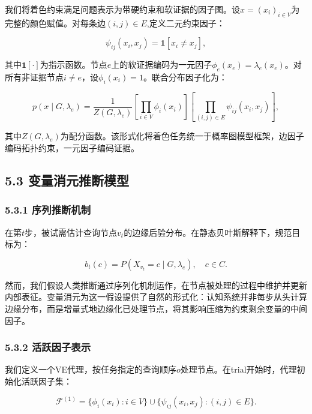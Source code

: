 我们将着色约束满足问题表示为带硬约束和软证据的因子图。设$x=(x_i)_{i\in V}$为完整的颜色赋值。对每条边$(i,j)\in E$,定义二元约束因子：

\begin{equation*}
\psi_{ij}(x_i,x_j)=\mathbf{1}[x_i\neq x_j],
\end{equation*}

其中$\mathbf{1}[\cdot]$为指示函数。节点$e$上的软证据编码为一元因子$\phi_e(x_e)=\lambda_e(x_e)$。对所有非证据节点$i\neq e$，设$\phi_i(x_i)=1$。联合分布因子化为：

\begin{equation*}
p(x\mid G,\lambda_e)=\frac{1}{Z(G,\lambda_e)}\left[\prod_{i\in V}\phi_i(x_i)\right]\left[\prod_{(i,j)\in E}\psi_{ij}(x_i,x_j)\right],
\end{equation*}

其中$Z(G,\lambda_e)$为配分函数。该形式化将着色任务统一于概率图模型框架，边因子编码拓扑约束，一元因子编码证据。

\subsection*{5.3 变量消元推断模型}

\subsubsection*{5.3.1 序列推断机制}

在第$t$步，被试需估计查询节点$v_t$的边缘后验分布。在静态贝叶斯解释下，规范目标为：

\begin{equation*}
b_t(c)=P(X_{v_t}=c\mid G,\lambda_e),\quad c\in C.
\end{equation*}

然而，我们假设人类推断通过序列化机制运作，在节点被处理的过程中维护并更新内部表征。变量消元为这一假设提供了自然的形式化：认知系统并非每步从头计算边缘分布，而是增量式地边缘化已处理节点，将其影响压缩为约束剩余变量的中间因子。

\subsubsection*{5.3.2 活跃因子表示}

我们定义一个VE代理，按任务指定的查询顺序$o$处理节点。在trial开始时，代理初始化活跃因子集：

\begin{equation*}
\mathcal{F}^{(1)}=\{\phi_i(x_i):i\in V\}\cup\{\psi_{ij}(x_i,x_j):(i,j)\in E\}.
\end{equation*}

